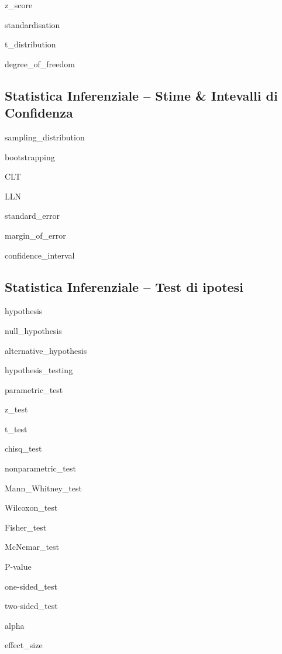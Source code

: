 \documentclass{report}
\begin{document}
\noindent \gls{z_score}

\noindent \gls{standardisation}

\noindent \gls{t_distribution}

\noindent \gls{degree_of_freedom}



\subsection*{Statistica Inferenziale -- Stime \& Intevalli di Confidenza}

\noindent \gls{sampling_distribution}

\noindent \gls{bootstrapping}

\noindent \gls{CLT}

\noindent \gls{LLN}

\noindent \gls{standard_error}

\noindent \gls{margin_of_error}

\noindent \gls{confidence_interval}




\subsection*{Statistica Inferenziale -- Test di ipotesi}

\noindent \gls{hypothesis}

\noindent \gls{null_hypothesis}

\noindent \gls{alternative_hypothesis}

\noindent \gls{hypothesis_testing}

\noindent \gls{parametric_test}

\noindent \gls{z_test}

\noindent \gls{t_test}

\noindent \gls{chisq_test}

\noindent \gls{nonparametric_test}

\noindent \gls{Mann_Whitney_test}

\noindent \gls{Wilcoxon_test}

\noindent \gls{Fisher_test}

\noindent \gls{McNemar_test}

\noindent \gls{P-value}

\noindent \gls{one-sided_test}

\noindent \gls{two-sided_test}

\noindent \gls{alpha}

\noindent \gls{effect_size}
\end{document}
